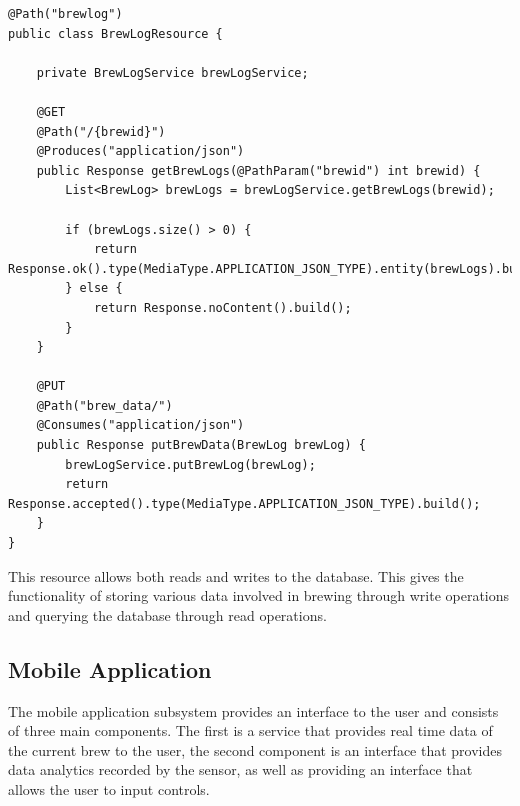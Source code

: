 \documentclass{article}
\begin{document}
\begin{lstlisting}
@Path("brewlog")
public class BrewLogResource {

    private BrewLogService brewLogService;
    
    @GET
    @Path("/{brewid}")
    @Produces("application/json")
    public Response getBrewLogs(@PathParam("brewid") int brewid) {
        List<BrewLog> brewLogs = brewLogService.getBrewLogs(brewid);

        if (brewLogs.size() > 0) {
            return Response.ok().type(MediaType.APPLICATION_JSON_TYPE).entity(brewLogs).build();
        } else {
            return Response.noContent().build();
        }
    }

    @PUT
    @Path("brew_data/")
    @Consumes("application/json")
    public Response putBrewData(BrewLog brewLog) {
        brewLogService.putBrewLog(brewLog);
        return Response.accepted().type(MediaType.APPLICATION_JSON_TYPE).build();
    }
}
\end{lstlisting}

\noindent This resource allows both reads and writes to the database. This gives the functionality of storing various data involved in brewing through write operations and querying the database through read operations. 

\subsection{Mobile Application}\label{subsec:mobile-app}
The mobile application subsystem provides an interface to the user and consists of three main components. The first is a service that provides real time data of the current brew to the user, the second component is an interface that provides data analytics recorded by the sensor, as well as providing an interface that allows the user to input controls.

\end{document}

